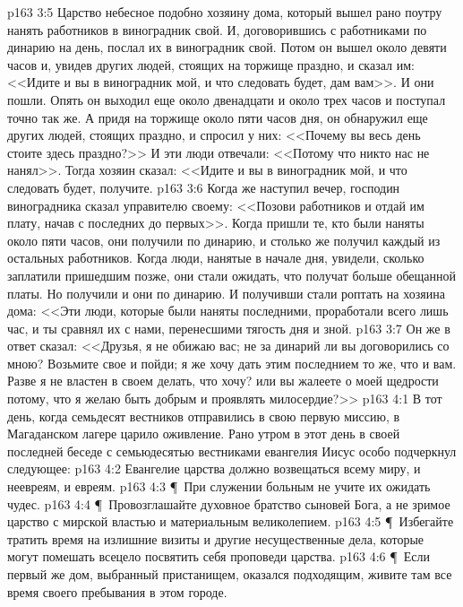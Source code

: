 \vs p163 3:5 Царство небесное подобно хозяину дома, который вышел рано поутру нанять работников в виноградник свой. И, договорившись с работниками по динарию на день, послал их в виноградник свой. Потом он вышел около девяти часов и, увидев других людей, стоящих на торжище праздно, и сказал им: <<Идите и вы в виноградник мой, и что следовать будет, дам вам>>. И они пошли. Опять он выходил еще около двенадцати и около трех часов и поступал точно так же. А придя на торжище около пяти часов дня, он обнаружил еще других людей, стоящих праздно, и спросил у них: <<Почему вы весь день стоите здесь праздно?>> И эти люди отвечали: <<Потому что никто нас не нанял>>. Тогда хозяин сказал: <<Идите и вы в виноградник мой, и что следовать будет, получите.
\vs p163 3:6 Когда же наступил вечер, господин виноградника сказал управителю своему: <<Позови работников и отдай им плату, начав с последних до первых>>. Когда пришли те, кто были наняты около пяти часов, они получили по динарию, и столько же получил каждый из остальных работников. Когда люди, нанятые в начале дня, увидели, сколько заплатили пришедшим позже, они стали ожидать, что получат больше обещанной платы. Но получили и они по динарию. И получивши стали роптать на хозяина дома: <<Эти люди, которые были наняты последними, проработали всего лишь час, и ты сравнял их с нами, перенесшими тягость дня и зной.
\vs p163 3:7 Он же в ответ сказал: <<Друзья, я не обижаю вас; не за динарий ли вы договорились со мною? Возьмите свое и пойди; я же хочу дать этим последнием то же, что и вам. Разве я не властен в своем делать, что хочу? или вы жалеете о моей щедрости потому, что я желаю быть добрым и проявлять милосердие?>>
\vs p163 4:1 В тот день, когда семьдесят вестников отправились в свою первую миссию, в Магаданском лагере царило оживление. Рано утром в этот день в своей последней беседе с семьюдесятью вестниками евангелия Иисус особо подчеркнул следующее:
\vs p163 4:2 \bibnobreakspace Евангелие царства должно возвещаться всему миру, и неевреям, и евреям.
\vs p163 4:3 \P\ \bibnobreakspace При служении больным не учите их ожидать чудес.
\vs p163 4:4 \P\ \bibnobreakspace Провозглашайте духовное братство сыновей Бога, а не зримое царство с мирской властью и материальным великолепием.
\vs p163 4:5 \P\ \bibnobreakspace Избегайте тратить время на излишние визиты и другие несущественные дела, которые могут помешать всецело посвятить себя проповеди царства.
\vs p163 4:6 \P\ \bibnobreakspace Если первый же дом, выбранный пристанищем, оказался подходящим, живите там все время своего пребывания в этом городе.
